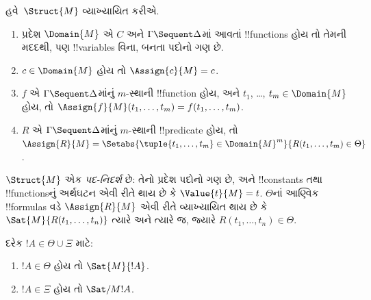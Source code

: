 \documentclass[../../../include/open-logic-section]{subfiles}
\begin{document}
હવે~$\Struct{M}$
વ્યાખ્યાયિત કરીએ.
\begin{enumerate}
\item પ્રદેશ
$\Domain{M}$ એ
$C$ અને
$\Gamma \Sequent \Delta$માં
આવતાં
!!{function}s
હોય તો તેમની
મદદથી, પણ
!!{variable}s વિના,
બનતા પદોનો
ગણ છે.
\item $c \in \Domain{M}$
હોય તો
$\Assign{c}{M} = c$.
\item $f$ એ
$\Gamma \Sequent \Delta$માંનું
$m$-સ્થાની
!!{function}
હોય, અને
$t_1$,
\dots,
$t_m \in \Domain{M}$
હોય, તો
$\Assign{f}{M}(t_1, \dots, t_m) =
f(t_1, \dots, t_m)$.
\item $R$ એ
$\Gamma \Sequent
\Delta$માંનું
$m$-સ્થાની
!!{predicate}
હોય, તો
$\Assign{R}{M} = \Setabs{\tuple{t_1, \dots, t_m} \in
\Domain{M}^m}{R(t_1, \dots, t_m) \in \Theta}$.
\end{enumerate}
$\Struct{M}$ એક
\emph{પદ-નિદર્શ}
છે: તેનો પ્રદેશ
પદોનો ગણ છે,
અને
!!{constant}s તથા
!!{function}sનું
અર્થઘટન એવી
રીતે થાય છે
કે
$\Value{t}{M} = t$.
$\Theta$નાં
આણ્વિક
!!{formula}s
વડે
$\Assign{R}{M}$
એવી રીતે
વ્યાખ્યાયિત
થાય છે કે
$\Sat{M}{R(t_1, \dots, t_n)}$
ત્યારે અને
ત્યારે જ,
જ્યારે
$R(t_1, \dots, t_n)
\in \Theta$.

\begin{lem}
દરેક
$!A \in \Theta \cup \Xi$
માટે:
\begin{enumerate}
  \item $!A \in \Theta$
  હોય તો
  $\Sat{M}{!A}$.
  \item $!A \in \Xi$
  હોય તો
  $\Sat/{M}{!A}$.
\end{enumerate}
\end{lem}
\end{document}

